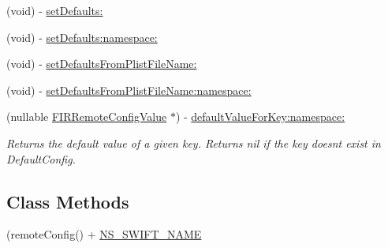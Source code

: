 \begin{DoxyCompactItemize}
\item 
(void) -\/ \hyperlink{interface_f_i_r_remote_config_a5a2fd04d83373458be28b53134468626}{set\+Defaults\+:}
\item 
(void) -\/ \hyperlink{interface_f_i_r_remote_config_aa65541a03ba03cd3e8edda8b489bdbb8}{set\+Defaults\+:namespace\+:}
\item 
(void) -\/ \hyperlink{interface_f_i_r_remote_config_a59c31913f532e4fe8298f3bbaa68336f}{set\+Defaults\+From\+Plist\+File\+Name\+:}
\item 
(void) -\/ \hyperlink{interface_f_i_r_remote_config_afe22d3f5654fc7184fd45cc90c68af2d}{set\+Defaults\+From\+Plist\+File\+Name\+:namespace\+:}
\item 
\hypertarget{interface_f_i_r_remote_config_a2e3b09b1be9658a1acf4ff6bc4b515e2}{}(nullable \hyperlink{interface_f_i_r_remote_config_value}{F\+I\+R\+Remote\+Config\+Value} $\ast$) -\/ \hyperlink{interface_f_i_r_remote_config_a2e3b09b1be9658a1acf4ff6bc4b515e2}{default\+Value\+For\+Key\+:namespace\+:}\label{interface_f_i_r_remote_config_a2e3b09b1be9658a1acf4ff6bc4b515e2}

\begin{DoxyCompactList}\small\item\em Returns the default value of a given key. Returns nil if the key doesn\textquotesingle{}t exist in Default\+Config. \end{DoxyCompactList}\end{DoxyCompactItemize}
\subsection*{Class Methods}
\begin{DoxyCompactItemize}
\item 
(remote\+Config() + \hyperlink{interface_f_i_r_remote_config_ab6df88b51e8cc757ecc0e8f7643b426b}{N\+S\+\_\+\+S\+W\+I\+F\+T\+\_\+\+N\+A\+M\+E}
\end{DoxyCompactItemize}
